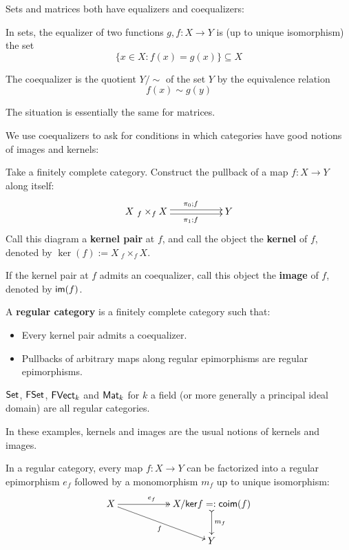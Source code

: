 \begin{example}
Sets and matrices both have equalizers and coequalizers:

In sets, the equalizer of two functions $g,f:X\to Y$ is (up to unique isomorphism) the set 
$$\{x \in X:f(x)=g(x)\} \subseteq X$$

The coequalizer is the quotient $Y/\sim$   of the set $Y$ by the equivalence relation 
$$f(x)\sim g(y)$$

The situation is essentially the same for matrices.
\end{example}


We  use coequalizers to ask for conditions in which categories have good notions of images and kernels:


\begin{definition}
Take a finitely complete category.  Construct the pullback of a map $f:X\to Y$ along itself:
 $$\xymatrix{X\ {}_f \times_f X  \ar@<-.5ex>[rr]_{\ \ \pi_1;f}  \ar@<.5ex>[rr]^{\ \ \pi_0;f}&& Y}$$
Call this diagram a {\bf kernel pair} at $f$, and call the object  the {\bf kernel} of $f$, denoted by $\ker(f):=X\ {}_f \times_f X$.

If the kernel pair at $f$ admits an coequalizer, call this object the {\bf image} of $f$, denoted by $\mathsf{im}(f)$.

A {\bf regular category} is a finitely complete category such that:
\begin{itemize}
\item Every kernel pair admits a coequalizer.

\item Pullbacks of arbitrary maps along regular epimorphisms are regular epimorphisms.
\end{itemize}

\end{definition}



\begin{example}
$\mathsf{Set}$, $\mathsf{FSet}$, $\mathsf{FVect}_k$ and  $\mathsf{Mat}_k$ for $k$ a field (or more generally a principal ideal domain) are all regular categories.

In these examples, kernels and images are the usual notions of kernels and images.
\end{example}


\begin{lemma}
In a regular category, every map $f:X\to Y$ can be factorized into a regular epimorphism $e_f$ followed by a monomorphism $m_f$ up to unique isomorphism:
$$
\xymatrix{
X \ar@{->>}[rr]^{\hspace*{-.7cm}e_f} \ar[drr]_{f} &&{X/\ker{f}=:\co\im(f)} \ar@{>->}[d]^{m_f}\\
                                        &&Y
}
$$
\end{lemma}


